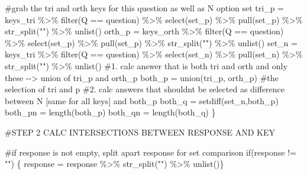 \documentclass[
  letterpaper,
  DIV=11,
  numbers=noendperiod]{scrreprt}
\newenvironment{Shaded}{\begin{snugshade}}{\end{snugshade}}
\newcommand{\CommentTok}[1]{\textcolor[rgb]{0.37,0.37,0.37}{#1}}
\newcommand{\ControlFlowTok}[1]{\textcolor[rgb]{0.00,0.23,0.31}{#1}}
\newcommand{\FunctionTok}[1]{\textcolor[rgb]{0.28,0.35,0.67}{#1}}
\newcommand{\NormalTok}[1]{\textcolor[rgb]{0.00,0.23,0.31}{#1}}
\newcommand{\OtherTok}[1]{\textcolor[rgb]{0.00,0.23,0.31}{#1}}
\newcommand{\SpecialCharTok}[1]{\textcolor[rgb]{0.37,0.37,0.37}{#1}}
\newcommand{\StringTok}[1]{\textcolor[rgb]{0.13,0.47,0.30}{#1}}
\begin{document}
\begin{Shaded}
\begin{Highlighting}[]
     \CommentTok{\#grab the tri and orth keys for this question as well as N option set}
\NormalTok{     tri\_p }\OtherTok{=}\NormalTok{  keys\_tri }\SpecialCharTok{\%\textgreater{}\%}  \FunctionTok{filter}\NormalTok{(Q }\SpecialCharTok{==}\NormalTok{ question) }\SpecialCharTok{\%\textgreater{}\%} \FunctionTok{select}\NormalTok{(set\_p) }\SpecialCharTok{\%\textgreater{}\%} \FunctionTok{pull}\NormalTok{(set\_p) }\SpecialCharTok{\%\textgreater{}\%} \FunctionTok{str\_split}\NormalTok{(}\StringTok{""}\NormalTok{) }\SpecialCharTok{\%\textgreater{}\%} \FunctionTok{unlist}\NormalTok{()}
\NormalTok{     orth\_p }\OtherTok{=}\NormalTok{ keys\_orth }\SpecialCharTok{\%\textgreater{}\%} \FunctionTok{filter}\NormalTok{(Q }\SpecialCharTok{==}\NormalTok{ question) }\SpecialCharTok{\%\textgreater{}\%} \FunctionTok{select}\NormalTok{(set\_p) }\SpecialCharTok{\%\textgreater{}\%} \FunctionTok{pull}\NormalTok{(set\_p) }\SpecialCharTok{\%\textgreater{}\%} \FunctionTok{str\_split}\NormalTok{(}\StringTok{""}\NormalTok{) }\SpecialCharTok{\%\textgreater{}\%} \FunctionTok{unlist}\NormalTok{()}
\NormalTok{     set\_n }\OtherTok{=}\NormalTok{  keys\_tri }\SpecialCharTok{\%\textgreater{}\%}  \FunctionTok{filter}\NormalTok{(Q }\SpecialCharTok{==}\NormalTok{ question) }\SpecialCharTok{\%\textgreater{}\%} \FunctionTok{select}\NormalTok{(set\_n) }\SpecialCharTok{\%\textgreater{}\%} \FunctionTok{pull}\NormalTok{(set\_n) }\SpecialCharTok{\%\textgreater{}\%} \FunctionTok{str\_split}\NormalTok{(}\StringTok{""}\NormalTok{) }\SpecialCharTok{\%\textgreater{}\%} \FunctionTok{unlist}\NormalTok{() }
     \CommentTok{\#1. calc answer that is both tri and orth and only these {-}{-}\textgreater{} union of tri\_p and orth\_p}
\NormalTok{     both\_p }\OtherTok{=} \FunctionTok{union}\NormalTok{(tri\_p, orth\_p) }\CommentTok{\#the selection of tri and p}
     \CommentTok{\#2. calc answers that shouldn\textquotesingle{}t be selected as difference between N [same for all keys] and both\_p}
\NormalTok{     both\_q }\OtherTok{=} \FunctionTok{setdiff}\NormalTok{(set\_n,both\_p)}
\NormalTok{     both\_pn }\OtherTok{=} \FunctionTok{length}\NormalTok{(both\_p)}
\NormalTok{     both\_qn }\OtherTok{=} \FunctionTok{length}\NormalTok{(both\_q)}
\NormalTok{  \}}
    
  \CommentTok{\#STEP 2 CALC INTERSECTIONS BETWEEN RESPONSE AND KEY}
  
  \CommentTok{\#if response is not empty, split apart response for set comparison}
    \ControlFlowTok{if}\NormalTok{(response }\SpecialCharTok{!=} \StringTok{""}\NormalTok{)}
\NormalTok{    \{ response }\OtherTok{=}\NormalTok{ response }\SpecialCharTok{\%\textgreater{}\%} \FunctionTok{str\_split}\NormalTok{(}\StringTok{""}\NormalTok{) }\SpecialCharTok{\%\textgreater{}\%} \FunctionTok{unlist}\NormalTok{()\}}
  

\end{Highlighting}
\end{Shaded}
\end{document}
